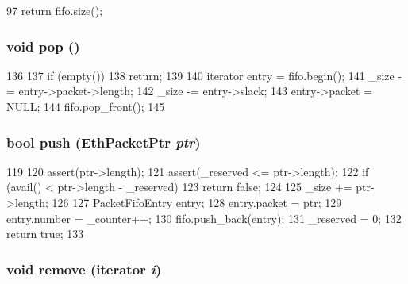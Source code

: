 \begin{DoxyCode}
97 { return fifo.size(); }
\end{DoxyCode}
\hypertarget{classPacketFifo_a312e7f6c761a199c1369fbe651e084f0}{
\subsubsection[{pop}]{\setlength{\rightskip}{0pt plus 5cm}void pop ()}}
\label{classPacketFifo_a312e7f6c761a199c1369fbe651e084f0}



\begin{DoxyCode}
136     {
137         if (empty())
138             return;
139 
140         iterator entry = fifo.begin();
141         _size -= entry->packet->length;
142         _size -= entry->slack;
143         entry->packet = NULL;
144         fifo.pop_front();
145     }
\end{DoxyCode}
\hypertarget{classPacketFifo_ac4382beafcf27ce14f59707bc7f4c3d7}{
\subsubsection[{push}]{\setlength{\rightskip}{0pt plus 5cm}bool push ({\bf EthPacketPtr} {\em ptr})}}
\label{classPacketFifo_ac4382beafcf27ce14f59707bc7f4c3d7}



\begin{DoxyCode}
119     {
120         assert(ptr->length);
121         assert(_reserved <= ptr->length);
122         if (avail() < ptr->length - _reserved)
123             return false;
124 
125         _size += ptr->length;
126 
127         PacketFifoEntry entry;
128         entry.packet = ptr;
129         entry.number = _counter++;
130         fifo.push_back(entry);
131         _reserved = 0;
132         return true;
133     }
\end{DoxyCode}
\hypertarget{classPacketFifo_a429e63f3d3384b4bb9e6514136c9e0f1}{
\subsubsection[{remove}]{\setlength{\rightskip}{0pt plus 5cm}void remove ({\bf iterator} {\em i})}}
\label{classPacketFifo_a429e63f3d3384b4bb9e6514136c9e0f1}




